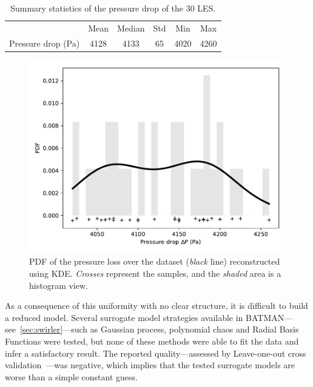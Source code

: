 \begin{table}[!ht]
\centering
\caption{Summary statistics of the pressure drop of the 30 LES.}
\begin{tabular}{lccccc}
\toprule
& Mean & Median & Std & Min & Max\\
\cmidrule{2-6}
Pressure drop (Pa) & 4128 & 4133 & 65 & 4020 & 4260\\
\bottomrule
\end{tabular}
\label{tab:summary-stats}
\end{table}

\begin{figure}[!ht]
\centering
\includegraphics[width=0.6\linewidth,keepaspectratio]{fig/applications/swirler/pdf_dp_ensemble.pdf}
\caption{PDF of the pressure loss over the dataset (\emph{black} line) reconstructed using KDE. \emph{Crosses} represent the samples, and the \emph{shaded} area is a histogram view.}
\label{fig:pdf-dp}
\end{figure}

As a consequence of this uniformity with no clear structure, it is difficult to build a reduced model. Several surrogate model strategies available in BATMAN---see~\cref{sec:swirler}---such as Gaussian process, polynomial chaos and Radial Basis Functions were tested, but none of these methods were able to fit the data and infer a satisfactory result. The reported quality---assessed by Leave-one-out cross validation~\cite{kohavi1995}---was negative, which implies that the tested surrogate models are worse than a simple constant guess.

